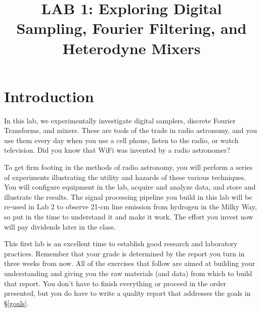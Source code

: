 \documentclass[11pt,preprint]{aastex}
\begin{document}
\def\simlt{\lower.5ex\hbox{$\; \buildrel < \over \sim \;$}}
\def\simgt{\lower.5ex\hbox{$\; \buildrel > \over \sim \;$}}
\def\wLO{\omega_0}

\title {LAB 1: Exploring Digital Sampling, Fourier Filtering, and Heterodyne Mixers}

\tableofcontents


\section{Introduction}

\noindent
In this lab, we experimentally investigate digital
samplers, discrete Fourier Transforms, and mixers. These are 
tools of the trade in radio astronomy, and
you use them every day when you use a cell phone, listen to the radio,
or watch television. Did you know that WiFi was invented by a radio
astronomer?

To get firm footing in the methods of radio astronomy, you will perform a series of
experiments illustrating the utility and hazards of these various techniques. 
You will configure equipment in the lab, acquire and analyze data, and store and illustrate the results.
The signal processing pipeline you build in this lab will be re-used in Lab 2 to
observe 21-cm line emission from hydrogen in the Milky Way, so 
put in the time to understand it and make it work. The effort you
invest now will pay dividends later in the class.

This first lab is an excellent time to establish good research and laboratory practices.
Remember that your grade is determined by the report you turn in
three weeks from now. All of the exercises that follow are aimed at building your
understanding and giving you the raw materials (and data) from which to build that report.
You don't have to finish everything or proceed in the order presented, but you do have
to write a quality report that addresses the goals in \S\ref{goals}.
\end{document}
